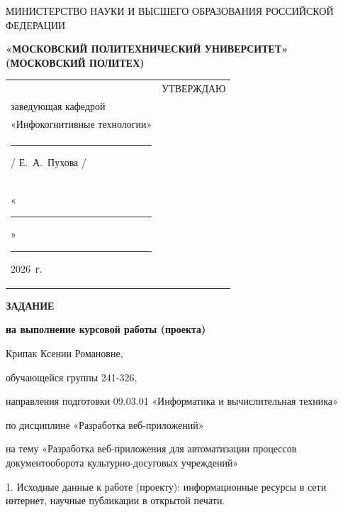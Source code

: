 \documentclass[14pt, a4paper]{extarticle}
\begin{document}
\pagestyle{empty}


\begin{center}
    {\small МИНИСТЕРСТВО НАУКИ И ВЫСШЕГО ОБРАЗОВАНИЯ РОССИЙСКОЙ ФЕДЕРАЦИИ}


    {\small \textbf{«МОСКОВСКИЙ ПОЛИТЕХНИЧЕСКИЙ УНИВЕРСИТЕТ»}} \\
    {\small \textbf{(МОСКОВСКИЙ ПОЛИТЕХ)}}
\end{center}

\begin{tabularx}{\textwidth}{@{} p{} p{} @{}}
     &
    \raggedright
    УТВЕРЖДАЮ                          \\
    заведующая кафедрой                \\
    «Инфокогнитивные технологии»       \\[0.3cm]

    \rule{3cm}{0.4pt} / Е.~А.~Пухова / \\[0.1cm]

    «\rule{0.8cm}{0.4pt}» \rule{3cm}{0.4pt} 2026~г.
\end{tabularx}


\begin{center}

    { \large \textbf{ЗАДАНИЕ}}

    \textbf{на выполнение курсовой работы (проекта)}

    Крипак Ксении Романовне, %

\end{center}

обучающейся группы 241-326,

направления подготовки 09.03.01 «Информатика и вычислительная техника»

по дисциплине «Разработка веб-приложений»

на тему «Разработка веб-приложения для автоматизации процессов документооборота культурно-досуговых учреждений»

1. Исходные данные к работе (проекту): информационные ресурсы в сети
интернет, научные публикации в открытой печати.
\end{document}
